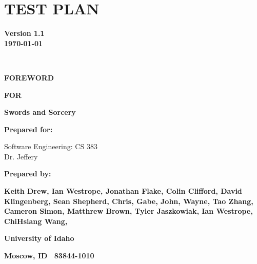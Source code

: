 \chapter{TEST PLAN}


{\centering{}\bfseries\color{black}
Version 1.1\\
\today
\par}

\ 

{\centering{}\bfseries\color{black}
FOREWORD
\par}
\bigskip

{\centering{}\bfseries\color{black}
FOR
\par}


\bigskip

{\centering{}\bfseries\color{black}
Swords and Sorcery
\par}




\begin{figure}
\centering
\end{figure}

\bigskip


\bigskip

{\centering{}\bfseries\color{black}
Prepared for: 
\par
Software Engineering: CS 383\\
Dr. Jeffery
\par}

\bigskip


\bigskip

{\centering{}\bfseries\color{black}
Prepared by:
\par}

{\centering{}\bfseries\color{black}
Keith Drew,
 Ian Westrope,
 Jonathan Flake,
 Colin Clifford,
 David Klingenberg,
 Sean Shepherd,
 Chris,
 Gabe,
 John,
 Wayne, 
 Tao Zhang,
 Cameron Simon,
 Matthrew Brown,
 Tyler Jaszkowiak,
 Ian Westrope,
 ChiHsiang Wang,
\par}

\bigskip

{\centering{}\bfseries\color{black}
University of Idaho
\par}

{\centering{}\bfseries\color{black}
Moscow, ID \ 83844-1010
\par}



